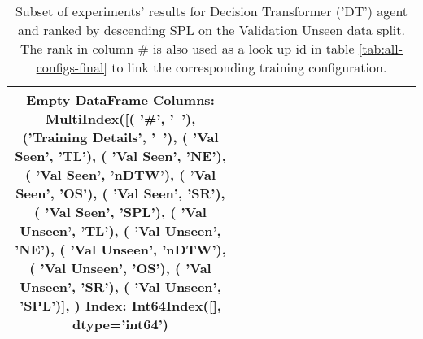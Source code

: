 \begin{table}
\centering
\caption{\label{tab:dt_full_dt_ablation_dim}Subset of experiments' results for Decision Transformer ('DT') agent and ranked by descending SPL on the Validation Unseen data split. The rank in column \# is also used as a look up id in table \ref{tab:all-configs-final} to link the corresponding training configuration.}
\begin{tabular}{@{\hskip3pt}c@{\hskip3pt}c@{\hskip3pt}c@{\hskip3pt}c@{\hskip3pt}c@{\hskip3pt}c@{\hskip3pt}c@{\hskip3pt}c@{\hskip3pt}c@{\hskip3pt}c@{\hskip3pt}c@{\hskip3pt}c@{\hskip3pt}c@{\hskip3pt}c@{\hskip3pt}c}
\toprule
Empty DataFrame
Columns: MultiIndex([(              '\textbf{\#}',    '\textbf{~}'),
            ('\textbf{Training Details}',    '\textbf{~}'),
            (        '\textbf{Val Seen}',   '\textbf{TL}'),
            (        '\textbf{Val Seen}',   '\textbf{NE}'),
            (        '\textbf{Val Seen}', '\textbf{nDTW}'),
            (        '\textbf{Val Seen}',   '\textbf{OS}'),
            (        '\textbf{Val Seen}',   '\textbf{SR}'),
            (        '\textbf{Val Seen}',  '\textbf{SPL}'),
            (      '\textbf{Val Unseen}',   '\textbf{TL}'),
            (      '\textbf{Val Unseen}',   '\textbf{NE}'),
            (      '\textbf{Val Unseen}', '\textbf{nDTW}'),
            (      '\textbf{Val Unseen}',   '\textbf{OS}'),
            (      '\textbf{Val Unseen}',   '\textbf{SR}'),
            (      '\textbf{Val Unseen}',  '\textbf{SPL}')],
           )
Index: Int64Index([], dtype='int64') \\
\bottomrule
\end{tabular}
\end{table}
